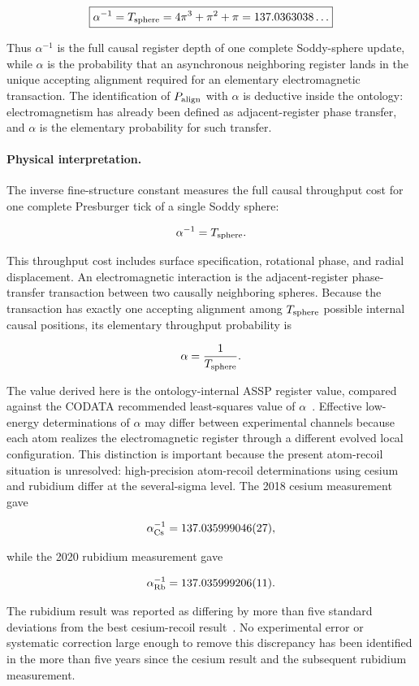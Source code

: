 \documentclass[11pt,a4paper]{article}
\begin{document}
\[
\boxed{
\alpha^{-1}
=
T_{\rm sphere}
=
4\pi^3+\pi^2+\pi
=
137.0363038\ldots
}
\]

Thus \(\alpha^{-1}\) is the full causal register depth of one complete Soddy-sphere update, while \(\alpha\) is the probability that an asynchronous neighboring register lands in the unique accepting alignment required for an elementary electromagnetic transaction. The identification of \(P_{\rm align}\) with \(\alpha\) is deductive inside the ontology: electromagnetism has already been defined as adjacent-register phase transfer, and \(\alpha\) is the elementary probability for such transfer.

\paragraph{Physical interpretation.}

The inverse fine-structure constant measures the full causal throughput cost for one complete Presburger tick of a single Soddy sphere:

\[
\alpha^{-1}
=
T_{\rm sphere}.
\]

This throughput cost includes surface specification, rotational phase, and radial displacement. An electromagnetic interaction is the adjacent-register phase-transfer transaction between two causally neighboring spheres. Because the transaction has exactly one accepting alignment among \(T_{\rm sphere}\) possible internal causal positions, its elementary throughput probability is

\[
\alpha
=
\frac{1}{T_{\rm sphere}}.
\]

The value derived here is the ontology-internal ASSP register value, compared against the CODATA recommended least-squares value of \(\alpha\)~\cite{CODATA2022}. Effective low-energy determinations of \(\alpha\) may differ between experimental channels because each atom realizes the electromagnetic register through a different evolved local configuration. This distinction is important because the present atom-recoil situation is unresolved: high-precision atom-recoil determinations using cesium and rubidium differ at the several-sigma level. The 2018 cesium measurement gave

\[
\alpha^{-1}_{\rm Cs}
=
137.035999046(27),
\]

while the 2020 rubidium measurement gave

\[
\alpha^{-1}_{\rm Rb}
=
137.035999206(11).
\]

The rubidium result was reported as differing by more than five standard deviations from the best cesium-recoil result~\cite{Parker2018,Morel2020}. No experimental error or systematic correction large enough to remove this discrepancy has been identified in the more than five years since the cesium result and the subsequent rubidium measurement.
\end{document}
